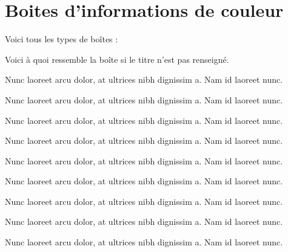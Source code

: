 \documentclass[french]{report}
\begin{document}
\chapter{Boites d'informations de couleur}
Voici tous les types de boîtes :

\begin{boxInfo}
    Voici à quoi ressemble la boîte si le titre n'est pas renseigné.
\end{boxInfo}
\newMediumLine

\begin{boxDefault}[boxDefault]
    Nunc laoreet arcu dolor, at ultrices nibh dignissim a. Nam id laoreet nunc.
\end{boxDefault}

\begin{boxInfo}[boxInfo]
    Nunc laoreet arcu dolor, at ultrices nibh dignissim a. Nam id laoreet nunc.
\end{boxInfo}

\begin{boxSuccess}[boxSuccess]
    Nunc laoreet arcu dolor, at ultrices nibh dignissim a. Nam id laoreet nunc.
\end{boxSuccess}

\begin{boxWarning}[boxWarning]
    Nunc laoreet arcu dolor, at ultrices nibh dignissim a. Nam id laoreet nunc.
\end{boxWarning}

\begin{boxDanger}[boxDanger]
    Nunc laoreet arcu dolor, at ultrices nibh dignissim a. Nam id laoreet nunc.
\end{boxDanger}

\begin{boxTeacher}[boxTeacher]
    Nunc laoreet arcu dolor, at ultrices nibh dignissim a. Nam id laoreet nunc.
\end{boxTeacher}

\begin{boxDownload}[boxDownload]
    Nunc laoreet arcu dolor, at ultrices nibh dignissim a. Nam id laoreet nunc.
\end{boxDownload}

\begin{boxHelp}[boxHelp]
    Nunc laoreet arcu dolor, at ultrices nibh dignissim a. Nam id laoreet nunc.
\end{boxHelp}

\begin{boxObjectif}[boxObjectif]
    Nunc laoreet arcu dolor, at ultrices nibh dignissim a. Nam id laoreet nunc.
\end{boxObjectif}
\end{document}
